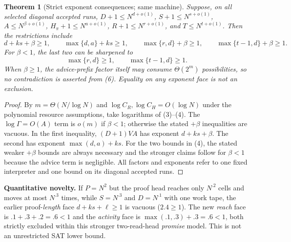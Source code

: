 \documentclass[11pt]{article}
\newtheorem{theorem}{Theorem}
\begin{document}
\begin{theorem}[Strict exponent consequences; same machine]\label{th:exponents}
Suppose, on all selected diagonal accepted runs, $D+1\le N^{d+o(1)}$, $S+1\le N^{s+o(1)}$, $A\le N^{\beta+o(1)}$, $H_\pi+1\le N^{a+o(1)}$, $R+1\le N^{r+o(1)}$, and $T\le N^{t+o(1)}$. Then the restrictions include
\[
\boxed{d+ks+\beta\ge1},\qquad
\boxed{\max\{d,a\}+ks\ge1},\qquad
\boxed{\max\{r,d\}+\beta\ge1},\qquad
\boxed{\max\{t-1,d\}+\beta\ge1}.
\tag{5}
\]
For $\beta<1$, the last two can be sharpened to
\[
\boxed{\max\{r,d\}\ge1,\qquad\max\{t-1,d\}\ge1}.
\tag{6}
\]
When $\beta\ge1$, the advice-prefix factor itself may consume $\Theta(2^m)$ possibilities, so no contradiction is asserted from (6). Equality on any exponent face is not an exclusion.
\end{theorem}
\begin{proof}
By $m=\Theta(N/\log N)$ and $\log C_R,\log C_H=O(\log N)$ under the polynomial resource assumptions, take logarithms of (3)--(4). The $\log\Gamma=O(A)$ term is $o(m)$ if $\beta<1$; otherwise the stated $+\beta$ inequalities are vacuous. In the first inequality, $(D+1)VA$ has exponent $d+ks+\beta$. The second has exponent $\max(d,a)+ks$. For the two bounds in (4), the stated weaker $+\beta$ bounds are always necessary and the stronger claims follow for $\beta<1$ because the advice term is negligible. All factors and exponents refer to one fixed interpreter and one bound on its diagonal accepted runs.\end{proof}

\noindent\textbf{Quantitative novelty.} If $P=N^2$ but the proof head reaches only $N^{.2}$ cells and moves at most $N^{.3}$ times, while $S=N^{.3}$ and $D=N^{.1}$ with one work tape, the earlier proof-\emph{length} face $d+ks+\ell\ge1$ is vacuous ($2.4\ge1$). The new \emph{reach} face is $.1+.3+.2=.6<1$ and the \emph{activity} face is $\max(.1,.3)+.3=.6<1$, both strictly excluded within this stronger two-read-head \emph{promise} model. This is not an unrestricted SAT lower bound.
\end{document}
